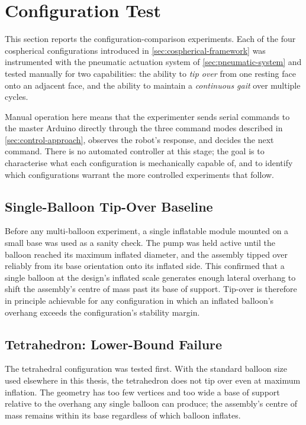 \section{Configuration Test}
\label{sec:configuration-test}

This section reports the configuration-comparison experiments. Each of the four cospherical configurations introduced in \cref{sec:cospherical-framework} was instrumented with the pneumatic actuation system of \cref{sec:pneumatic-system} and tested manually for two capabilities: the ability to \textit{tip over} from one resting face onto an adjacent face, and the ability to maintain a \textit{continuous gait} over multiple cycles.

Manual operation here means that the experimenter sends serial commands to the master Arduino directly through the three command modes described in \cref{sec:control-approach}, observes the robot's response, and decides the next command. There is no automated controller at this stage; the goal is to characterise what each configuration is mechanically capable of, and to identify which configurations warrant the more controlled experiments that follow.

\subsection{Single-Balloon Tip-Over Baseline}
\label{subsec:single-balloon-tip}

Before any multi-balloon experiment, a single inflatable module mounted on a small base was used as a sanity check. The pump was held active until the balloon reached its maximum inflated diameter, and the assembly tipped over reliably from its base orientation onto its inflated side. This confirmed that a single balloon at the design's inflated scale generates enough lateral overhang to shift the assembly's centre of mass past its base of support. Tip-over is therefore in principle achievable for any configuration in which an inflated balloon's overhang exceeds the configuration's stability margin.

\subsection{Tetrahedron: Lower-Bound Failure}
\label{subsec:tetra-test}

The tetrahedral configuration was tested first. With the standard balloon size used elsewhere in this thesis, the tetrahedron does not tip over even at maximum inflation. The geometry has too few vertices and too wide a base of support relative to the overhang any single balloon can produce; the assembly's centre of mass remains within its base regardless of which balloon inflates.

